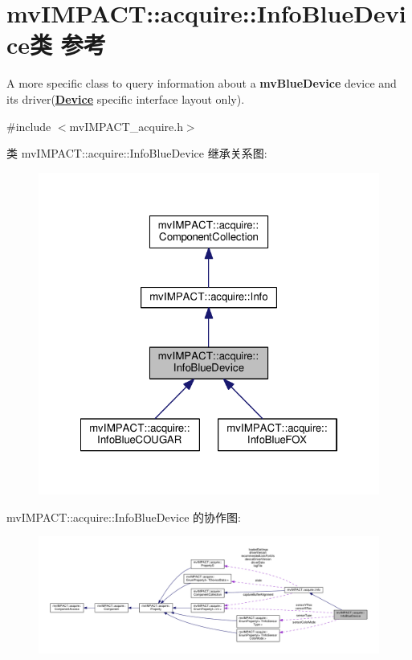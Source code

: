 \hypertarget{classmv_i_m_p_a_c_t_1_1acquire_1_1_info_blue_device}{\section{mv\+I\+M\+P\+A\+C\+T\+:\+:acquire\+:\+:Info\+Blue\+Device类 参考}
\label{classmv_i_m_p_a_c_t_1_1acquire_1_1_info_blue_device}
}


A more specific class to query information about a {\bfseries mv\+Blue\+Device} device and its driver({\bfseries \hyperlink{classmv_i_m_p_a_c_t_1_1acquire_1_1_device}{Device}} specific interface layout only).  




{\ttfamily \#include $<$mv\+I\+M\+P\+A\+C\+T\+\_\+acquire.\+h$>$}



类 mv\+I\+M\+P\+A\+C\+T\+:\+:acquire\+:\+:Info\+Blue\+Device 继承关系图\+:
\nopagebreak
\begin{figure}[H]
\begin{center}
\leavevmode
\includegraphics[width=322pt]{classmv_i_m_p_a_c_t_1_1acquire_1_1_info_blue_device__inherit__graph}
\end{center}
\end{figure}


mv\+I\+M\+P\+A\+C\+T\+:\+:acquire\+:\+:Info\+Blue\+Device 的协作图\+:
\nopagebreak
\begin{figure}[H]
\begin{center}
\leavevmode
\includegraphics[width=350pt]{classmv_i_m_p_a_c_t_1_1acquire_1_1_info_blue_device__coll__graph}
\end{center}
\end{figure}
